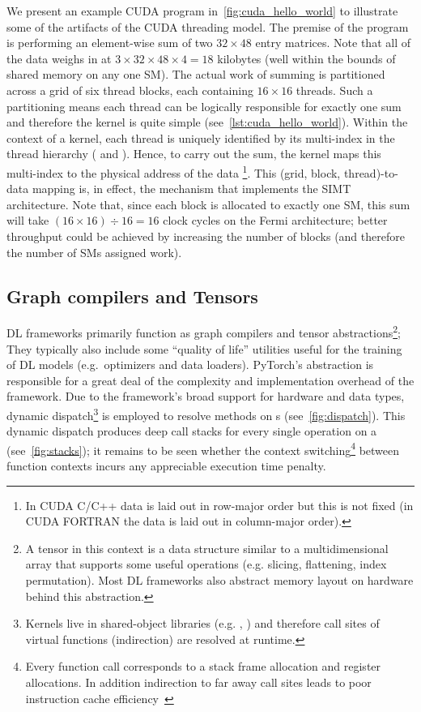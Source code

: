 We present an example CUDA program in~\cref{fig:cuda_hello_world} to illustrate some of the artifacts of the CUDA threading model.
The premise of the program is performing an element-wise sum of two $32 \times 48$ entry matrices.
Note that all of the data weighs in at  $3 \times 32 \times 48 \times 4 = 18$ kilobytes (well within the bounds of shared memory on any one SM).
The actual work of summing is partitioned across a grid of six thread blocks, each containing $16 \times 16$ threads.
Such a partitioning means each thread can be logically responsible for exactly one sum and therefore the kernel is quite simple (see~\cref{lst:cuda_hello_world}).
Within the context of a kernel, each thread is uniquely identified by its multi-index in the thread hierarchy ( and ).
Hence, to carry out the sum, the kernel maps this multi-index to the physical address of the data%
\footnote{In CUDA C/C++ data is laid out in row-major order but this is not fixed (in CUDA FORTRAN the data is laid out in column-major order).}.
This (grid, block, thread)-to-data mapping is, in effect, the mechanism that implements the SIMT architecture.
Note that, since each block is allocated to exactly one SM, this sum will take $\left( 16 \times 16 \right) \div 16 = 16$ clock cycles on the Fermi architecture;
better throughput could be achieved by increasing the number of blocks (and therefore the number of SMs assigned work).



\subsection{Graph compilers and Tensors}\label{subsec:graph-compilers}

DL frameworks primarily function as graph compilers and tensor abstractions\footnote{A tensor in this context is a data structure similar to a multidimensional array that supports some useful operations (e.g. slicing, flattening, index permutation). Most DL frameworks also abstract memory layout on hardware behind this abstraction.};
They typically also include some ``quality of life'' utilities useful for the training of DL models (e.g.\ optimizers and data loaders).
PyTorch's  abstraction is responsible for a great deal of the complexity and implementation overhead of the framework.
Due to the framework's broad support for hardware and data types, dynamic dispatch\footnote{Kernels live in shared-object libraries (e.g. , ) and therefore call sites of virtual functions (indirection) are resolved at runtime.} is employed to resolve methods on s (see~\cref{fig:dispatch}).
This dynamic dispatch produces deep call stacks for every single operation on a  (see~\cref{fig:stacks}); it remains to be seen whether the context switching\footnote{Every function call corresponds to a stack frame allocation and register allocations. In addition indirection to far away call sites leads to poor instruction cache efficiency~\cite{10.5555/3314872.3314876}} between function contexts incurs any appreciable execution time penalty.

